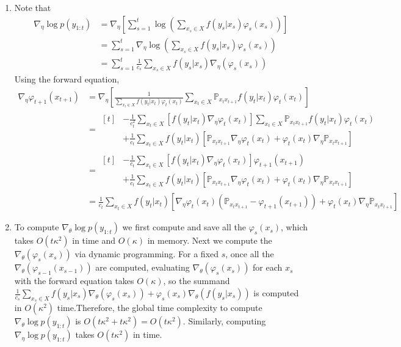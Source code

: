 \documentclass[a4paper,11pt, hidelinks]{article}
\begin{document}
\begin{enumerate}[label=(\alph*)]
	\item Note that 
	$$\begin{aligned}
		\nabla_\eta \log p(y_{1:t}) &= \nabla_\eta\left[\sum_{s=1}^t \log \left(\sum_{x_s\in X} f(y_s|x_s) \varphi_{s}(x_s)\right)  \right]\\
		&= \sum_{s=1}^t \nabla_\eta \log \left(\sum_{x_s\in X} f(y_s|x_s) \varphi_{s}(x_s)\right)\\
		&= \sum_{s=1}^t \frac{1}{c_s} \sum_{x_s\in X} f(y_s|x_s) \nabla_\eta(\varphi_{s}(x_s))  
	\end{aligned}$$
Using the forward equation,
	$$\begin{aligned}
		\nabla_\eta \varphi_{t+1}(x_{t+1}) &= \nabla_\eta\left[\frac{1}{\sum_{x_t\in X} f(y_t|x_t) \varphi_{t}(x_{t})} \sum_{x_t\in X} \mathbb P_{x_{t} x_{t+1}} f(y_t|x_t) \varphi_{t}(x_{t}) \right]\\
		&= \begin{aligned}[t]
			&-\frac{1}{c_t^2} \sum_{x_t\in X} \left[ f(y_t|x_t) \nabla_\eta \varphi_{t}(x_{t}) \right] \sum_{x_t\in X} \mathbb P_{x_{t} x_{t+1}} f(y_t|x_t) \varphi_{t}(x_{t})\\
			&+ \frac{1}{c_t} \sum_{x_t\in X} f(y_t|x_t)\left[ \mathbb P_{x_{t} x_{t+1}} \nabla_\eta \varphi_{t}(x_{t}) + \varphi_{t}(x_{t}) \nabla_\eta \mathbb P_{x_{t} x_{t+1}}\right]
		\end{aligned}\\
		&= \begin{aligned}[t]
			&-\frac{1}{c_t} \sum_{x_t\in X} \left[ f(y_t|x_t) \nabla_\eta \varphi_{t}(x_{t}) \right] \varphi_{t+1}(x_{t+1})\\
			&+ \frac{1}{c_t} \sum_{x_t\in X} f(y_t|x_t)\left[ \mathbb P_{x_{t} x_{t+1}} \nabla_\eta \varphi_{t}(x_{t}) + \varphi_{t}(x_{t}) \nabla_\eta \mathbb P_{x_{t} x_{t+1}}\right]
		\end{aligned}\\
		&= \frac{1}{c_t} \sum_{x_t\in X} f(y_t|x_t) \left[ \nabla_\eta \varphi_{t}(x_{t}) (\mathbb P_{x_{t} x_{t+1}} - \varphi_{t+1}(x_{t+1})) + \varphi_{t}(x_{t}) \nabla_\eta \mathbb P_{x_{t} x_{t+1}} \right]
	\end{aligned}$$

	\item To compute $\nabla_\theta \log p(y_{1:t})$ we first compute and save all the $\varphi_{s}(x_{s})$, which takes $O(t\kappa^2)$ in time and $O(\kappa)$ in memory. Next we compute the $\nabla_\theta(\varphi_{s}(x_s))$ via dynamic programming. For a fixed $s$, once all the $\nabla_\theta(\varphi_{s-1}(x_{s-1}))$ are computed, evaluating $\nabla_\theta(\varphi_{s}(x_s))$ for each $x_s$ with the forward equation takes $O(\kappa)$, so the summand $\frac{1}{c_s} \sum_{x_s\in X} f(y_s|x_s) \nabla_\theta(\varphi_{s}(x_s)) +  \varphi_{s}(x_s)\nabla_\theta (f(y_s|x_s))$ is computed in $O(\kappa^2)$ time.\newline \newline Therefore, the global time complexity to compute $\nabla_\theta \log p(y_{1:t})$ is $O(t\kappa^2+t\kappa^2) = O(t\kappa^2)$. Similarly, computing $\nabla_\eta \log p(y_{1:t})$ takes $O(t\kappa^2)$ in time.


\end{enumerate}
\end{document}

